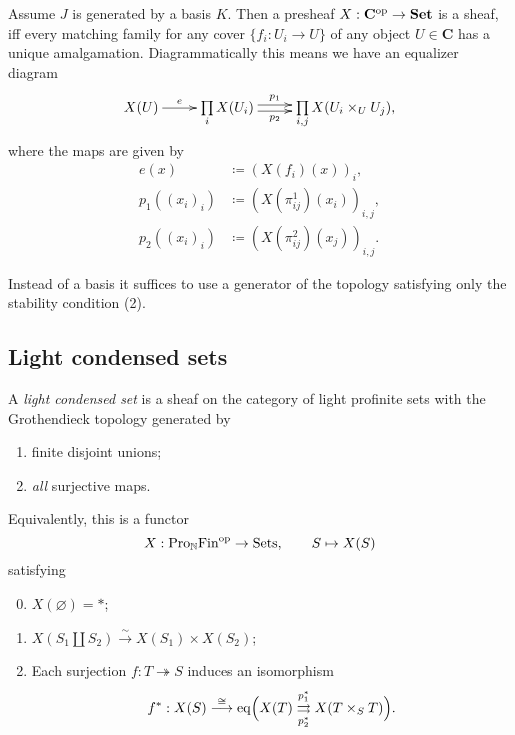 \documentclass{notes}
\def\C{\mathbf{C}}
\def\Set{\mathbf{Set}}
\def\op{\textup{op}}
\begin{document}
{	\begin{prop}
		Assume $J$ is generated by a basis $K$.
		Then a presheaf $X : \C^\op \rightarrow \Set$ is a sheaf, iff every matching family for any cover $\{f_i : U_i \rightarrow U\}$ of any object $U \in \C$ has a unique amalgamation.
		Diagrammatically this means we have an equalizer diagram
		\begin{equation*}
			\xymatrix{
				X(U) \ar[r]^-e & \prod\limits_i X(U_i) \ar@<0.5ex>[r]^-{p_1} \ar@<-0.5ex>[r]_-{p_2} & \prod\limits_{i,j} X(U_i \times_U U_j),
			}
		\end{equation*}
		where the maps are given by
		\begin{align*}
			e(x) & \coloneq (X(f_i)(x))_i, \\
			p_1((x_i)_i) & \coloneq (X(\pi_{ij}^1)(x_i))_{i,j}, \\
			p_2((x_i)_i) & \coloneq (X(\pi_{ij}^2)(x_j))_{i,j}.
		\end{align*}
	\end{prop}
	
	\begin{remark}
		Instead of a basis it suffices to use a generator of the topology satisfying only the stability condition (2).
	\end{remark}
}

\subsection{Light condensed sets}

\begin{defi}
A {\em light condensed set} is a sheaf on the category of light
profinite sets with the Grothendieck topology generated by
\begin{enumerate}
\item finite disjoint unions;
\item {\em all} surjective maps.
\end{enumerate}
Equivalently, this is a functor 
$$
  X: \text{Pro}_{\mathbb{N}}\text{Fin}^{\rm op} \to \text{Sets},\qquad S\mapsto X(S)
$$
satisfying
\begin{enumerate}
\setcounter{enumi}{-1}
\item $X(\varnothing)=*$;
\item $X(S_1\amalg S_2)\stackrel{\sim}\longrightarrow X(S_1)\times X(S_2)$;
\item Each surjection $f:T\twoheadrightarrow S$ induces an isomorphism
$$
  f^*:X(S) \stackrel{\cong}\longrightarrow {\rm eq}\Bigl(X(T)
  \overset{p_1^*}{\underset{p_2^*}{\rightrightarrows}} X(T\times_ST)\Bigr).
$$
\end{enumerate}
\end{defi}
\end{document}
